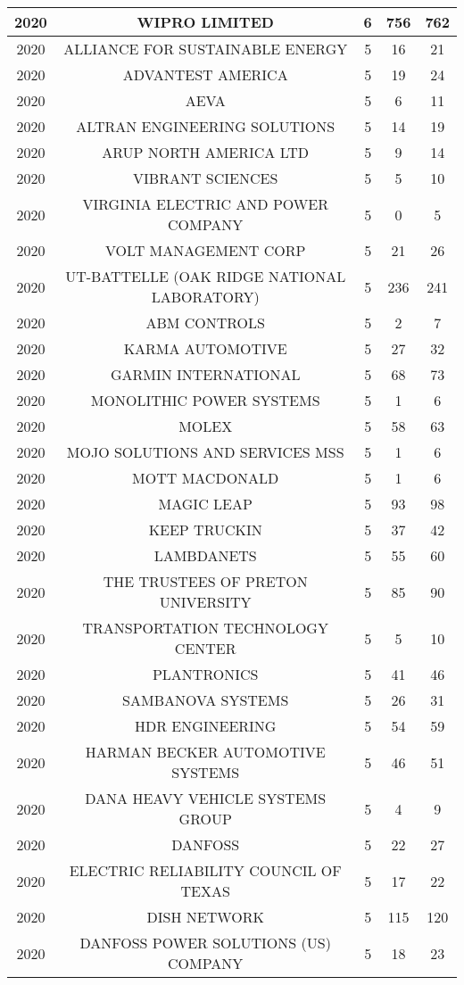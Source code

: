 \documentclass{article}%
\begin{document}
\begin{longtable}{c|c|c|c|c}
\hline%
2020&WIPRO LIMITED&6&756&762\\%
\hline%
2020&ALLIANCE FOR SUSTAINABLE ENERGY&5&16&21\\%
\hline%
2020&ADVANTEST AMERICA&5&19&24\\%
\hline%
2020&AEVA&5&6&11\\%
\hline%
2020&ALTRAN ENGINEERING SOLUTIONS&5&14&19\\%
\hline%
2020&ARUP NORTH AMERICA LTD&5&9&14\\%
\hline%
2020&VIBRANT SCIENCES&5&5&10\\%
\hline%
2020&VIRGINIA ELECTRIC AND POWER COMPANY&5&0&5\\%
\hline%
2020&VOLT MANAGEMENT CORP&5&21&26\\%
\hline%
2020&UT{-}BATTELLE  (OAK RIDGE NATIONAL LABORATORY)&5&236&241\\%
\hline%
2020&ABM CONTROLS&5&2&7\\%
\hline%
2020&KARMA AUTOMOTIVE&5&27&32\\%
\hline%
2020&GARMIN INTERNATIONAL&5&68&73\\%
\hline%
2020&MONOLITHIC POWER SYSTEMS&5&1&6\\%
\hline%
2020&MOLEX&5&58&63\\%
\hline%
2020&MOJO SOLUTIONS AND SERVICES MSS&5&1&6\\%
\hline%
2020&MOTT MACDONALD&5&1&6\\%
\hline%
2020&MAGIC LEAP&5&93&98\\%
\hline%
2020&KEEP TRUCKIN&5&37&42\\%
\hline%
2020&LAMBDANETS&5&55&60\\%
\hline%
2020&THE TRUSTEES OF PRETON UNIVERSITY&5&85&90\\%
\hline%
2020&TRANSPORTATION TECHNOLOGY CENTER&5&5&10\\%
\hline%
2020&PLANTRONICS&5&41&46\\%
\hline%
2020&SAMBANOVA SYSTEMS&5&26&31\\%
\hline%
2020&HDR ENGINEERING&5&54&59\\%
\hline%
2020&HARMAN BECKER AUTOMOTIVE SYSTEMS&5&46&51\\%
\hline%
2020&DANA HEAVY VEHICLE SYSTEMS GROUP&5&4&9\\%
\hline%
2020&DANFOSS&5&22&27\\%
\hline%
2020&ELECTRIC RELIABILITY COUNCIL OF TEXAS&5&17&22\\%
\hline%
2020&DISH NETWORK&5&115&120\\%
\hline%
2020&DANFOSS POWER SOLUTIONS (US) COMPANY&5&18&23\\%

\end{longtable}
\end{document}
